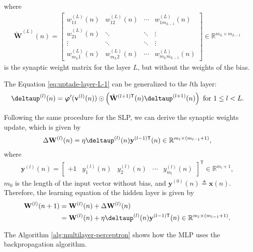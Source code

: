 \documentclass[12pt,a4paper]{article}
\newcommand{\trans}{\mathsf{T}}
\newcommand{\Real}{\mathbb{R}}
\begin{document}
where
\begin{align}
    \tilde{\mathbf{W}}^{(L)}(n) = \begin{bmatrix}
        w_{11}^{(L)} (n) & w_{12}^{(L)} (n) & \cdots & w_{1 m_{L-1}}^{(L)} (n) \\
        w_{21}^{(L)} (n) & \ddots & \ddots & \vdots \\
        \vdots & \ddots & \ddots & \vdots \\
        w_{m_L1}^{(L)} (n) & w_{m_L2}^{(L)} (n) & \cdots & w_{m_Lm_{L-1}}^{(L)} (n)
    \end{bmatrix} \in \Real^{m_L \times m_{L-1}}
\end{align}
is the synaptic weight matrix for the layer \(L\), but without the weights of the bias.

The Equation \eqref{eq:uptade-layer-L-1} can be generalized to the \(l\)th layer:
\begin{align}
    \boldsymbol{\deltaup}^{(l)} (n) = \boldsymbol{\varphi}'(\mathbf{v}^{(l)}(n)) \odot \left( \tilde{\mathbf{W}}^{(l+1)\trans}(n) \boldsymbol{\deltaup}^{(l+1)} (n) \right)\text{ for } 1\leq l < L.
    \label{eq:uptade-layer-l}
\end{align}

Following the same procedure for the SLP, we can derive the synaptic weights update, which is given by
\begin{align}
    \Delta \mathbf{W}^{(l)}(n) = \eta\boldsymbol{\deltaup}^{(l)}(n) \mathbf{y}^{(l-1)\trans}(n) \in \Real^{m_l \times (m_{l-1}+1)},
\end{align}
where
\begin{align}
    \mathbf{y}^{(l)}(n) = \begin{bmatrix}
        +1 & y_1^{(l)}(n) & y_2^{(l)}(n) & \cdots & y_{m_{l}}^{(l)}(n)
    \end{bmatrix}^\trans \in \Real^{m_{l}+1},
\end{align}
\(m_0\) is the length of the input vector without bias, and \(\mathbf{y}^{(0)}(n) \triangleq \mathbf{x}(n)\). Therefore, the learning equation of the hidden layer is given by
\begin{align}
    \mathbf{W}^{(l)}(n+1) & = \mathbf{W}^{(l)}(n) + \Delta \mathbf{W}^{(l)}(n) \nonumber \\
    & = \mathbf{W}^{(l)}(n) + \eta\boldsymbol{\deltaup}^{(l)}(n) \mathbf{y}^{(l-1)\trans}(n) \in \Real^{m_l \times (m_{l-1}+1)}.
\end{align}


The Algorithm \ref{alg:multilayer-perceptron} shows how the MLP uses the backpropagation algorithm.
\end{document}
